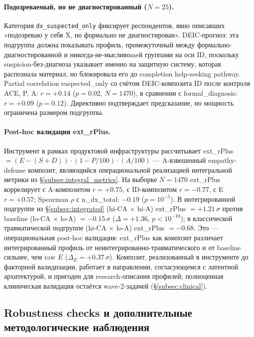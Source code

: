 \paragraph{Подозреваемый, но не диагностированный ($N = 25$).} Категория \texttt{dx\_suspected\_only} фиксирует респондентов, явно описавших «подозреваю у себя X, но формально не диагностирован». DEIC-прогноз: эта подгруппа должна показывать профиль, промежуточный между формально-диагностированной и никогда-не-мысливоmeй группами на оси ID, поскольку suspicion-без-диагноза указывает именно на защитную систему, которая распознала материал, но блокировала его до completion help-seeking pathway. Partial correlation suspected\_only со счётом DEIC-композита ID после контроля ACE, P, A: $r = +0.14$ ($p = 0.02$, $N = 1470$), в сравнении с formal\_diagnosis: $r = +0.09$ ($p = 0.12$). Директивно подтверждает предсказание, но мощность ограничена размером подгруппы.

\paragraph{Post-hoc валидация ext\_rPlus.} Инструмент в рамках продуктовой инфраструктуры рассчитывает ext\_rPlus $= (E - (S + D)) \cdot (1 - P/100) \cdot (A/100)$ --- A-взвешенный empathy-defense композит, являющийся операциональной реализацией интегральной метрики из §\ref{subsec:integral_metrics}. На выборке $N = 1470$ ext\_rPlus коррелирует с A-композитом $r = +0.75$, с ID-композитом $r = -0.77$, с E $r = +0.57$; Spearman $\rho$ с n\_dx\_total: $-0.19$ ($p = 10^{-5}$). В интегрированной подгруппе из §\ref{subsec:integrated} (hi-CA $\times$ hi-A) ext\_rPlus $= +1.21\,\sigma$ против baseline (lo-CA $\times$ lo-A) $= -0.15\,\sigma$ ($\Delta = +1.36$, $p < 10^{-10}$); в классической травматической подгруппе (hi-CA $\times$ lo-A) ext\_rPlus $= -0.68$. Это --- операциональная post-hoc валидация: ext\_rPlus как композит различает интегрированный профиль от неинтегрированно-травматического и от baseline сильнее, чем raw $E$ ($\Delta_E = +0.37\,\sigma$). Композит, реализованный в инструменте до факторной валидизации, работает в направлении, согласующемся с латентной архитектурой, и пригоден для research-описания профилей; полноценная клиническая валидация остаётся wave-2-задачей (§\ref{subsec:clinical}).

\subsection{Robustness checks и дополнительные методологические наблюдения}
\label{subsec:robustness}

